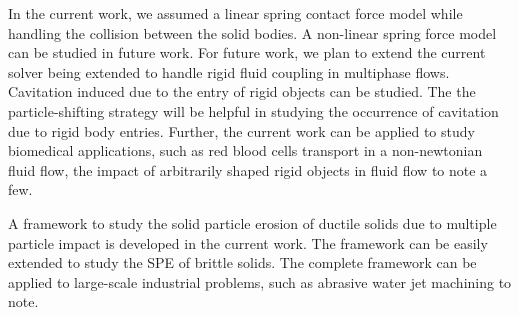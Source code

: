 In the current work, we assumed a linear spring contact force model while
handling the collision between the solid bodies. A non-linear spring force model
can be studied in future work. For future work, we plan to extend the current
solver being extended to handle rigid fluid coupling in multiphase flows.
Cavitation induced due to the entry of rigid objects can be studied. The
the particle-shifting strategy will be helpful in studying the occurrence of
cavitation due to rigid body entries. Further, the current work can be applied
to study biomedical applications, such as red blood cells transport in a
non-newtonian fluid flow, the impact of arbitrarily shaped rigid objects in fluid
flow to note a few.

A framework to study the solid particle erosion of ductile solids due to multiple
particle impact is developed in the current work. The framework can be easily
extended to study the SPE of brittle solids. The complete framework can be applied
to large-scale industrial problems, such as abrasive water jet machining to note.

